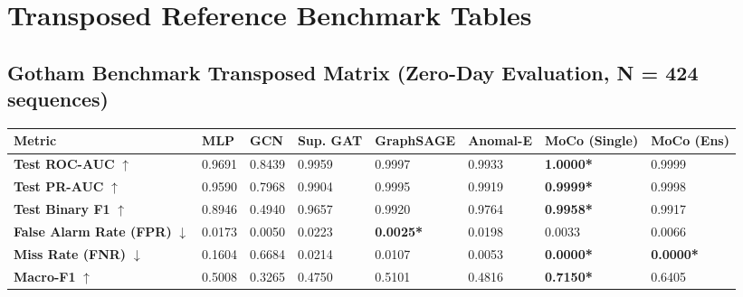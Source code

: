 \documentclass[10pt,a4paper]{article}
\newcommand{\best}[1]{\textbf{\textcolor{bestgreen}{#1*}}}
\begin{document}
\section{Transposed Reference Benchmark Tables}

\subsection{Gotham Benchmark Transposed Matrix (Zero-Day Evaluation, N = 424 sequences)}
\begin{table}[htbp]
\centering
\small
\begin{tabularx}{\textwidth}{lXXXXXXX}
\toprule
\textbf{Metric} & \textbf{MLP} & \textbf{GCN} & \textbf{Sup. GAT} & \textbf{GraphSAGE} & \textbf{Anomal-E} & \textbf{MoCo (Single)} & \textbf{MoCo (Ens)} \\
\midrule
\textbf{Test ROC-AUC} $\uparrow$ & 0.9691 & 0.8439 & 0.9959 & 0.9997 & 0.9933 & \best{1.0000} & 0.9999 \\
\textbf{Test PR-AUC} $\uparrow$ & 0.9590 & 0.7968 & 0.9904 & 0.9995 & 0.9919 & \best{0.9999} & 0.9998 \\
\textbf{Test Binary F1} $\uparrow$ & 0.8946 & 0.4940 & 0.9657 & 0.9920 & 0.9764 & \best{0.9958} & 0.9917 \\
\textbf{False Alarm Rate (FPR)} $\downarrow$ & 0.0173 & 0.0050 & 0.0223 & \best{0.0025} & 0.0198 & 0.0033 & 0.0066 \\
\textbf{Miss Rate (FNR)} $\downarrow$ & 0.1604 & 0.6684 & 0.0214 & 0.0107 & 0.0053 & \best{0.0000} & \best{0.0000} \\
\textbf{Macro-F1} $\uparrow$ & 0.5008 & 0.3265 & 0.4750 & 0.5101 & 0.4816 & \best{0.7150} & 0.6405 \\
\bottomrule
\end{tabularx}
\end{table}
\end{document}
